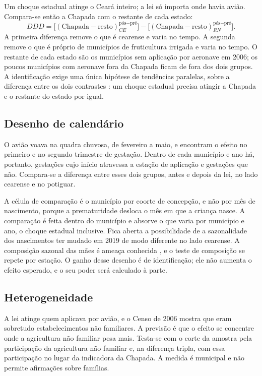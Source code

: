 Um choque estadual atinge o Ceará inteiro; a lei só importa onde havia avião.
Compara-se então a Chapada com o restante de cada estado:
\[
DDD = \big[(\text{Chapada} - \text{resto})_{CE}^{\text{pós}-\text{pré}}\big] -
      \big[(\text{Chapada} - \text{resto})_{RN}^{\text{pós}-\text{pré}}\big].
\]
A primeira diferença remove o que é cearense e varia no tempo. A segunda remove
o que é próprio de municípios de fruticultura irrigada e varia no tempo. O
restante de cada estado são os municípios sem aplicação por aeronave em 2006;
os poucos municípios com aeronave fora da Chapada ficam de fora dos dois
grupos. A identificação exige uma única hipótese de tendências paralelas, sobre
a diferença entre os dois contrastes \cite{olden2022triple}: um choque
estadual precisa atingir a Chapada e o restante do estado por igual.

\subsection{Desenho de calendário}
\label{sec:calendario}

O avião voava na quadra chuvosa, de fevereiro a maio, e
 encontram o efeito no primeiro e no segundo trimestre
de gestação. Dentro de cada município e ano há, portanto, gestações cujo início
atravessa a estação de aplicação e gestações que não. Compara-se a diferença
entre esses dois grupos, antes e depois da lei, no lado cearense e no potiguar.

A célula de comparação é o município por coorte de concepção, e não por mês de
nascimento, porque a prematuridade desloca o mês em que a criança nasce. A
comparação é feita dentro do município e absorve o que varia por município e
ano, o choque estadual inclusive. Fica aberta a possibilidade de a sazonalidade
dos nascimentos ter mudado em 2019 de modo diferente no lado cearense. A
composição sazonal das mães é ameaça conhecida \cite{buckles2013,
currie2013}, e o teste de composição se repete por estação. O ganho desse
desenho é de identificação; ele não aumenta o efeito esperado, e o seu poder
será calculado à parte.

\subsection{Heterogeneidade}

A lei atinge quem aplicava por avião, e o Censo de 2006 mostra que eram
sobretudo estabelecimentos não familiares. A previsão é que o efeito se
concentre onde a agricultura não familiar pesa mais. Testa-se com o corte da
amostra pela participação da agricultura não familiar e, na diferença tripla,
com essa participação no lugar da indicadora da Chapada. A medida é municipal e
não permite afirmações sobre famílias.


